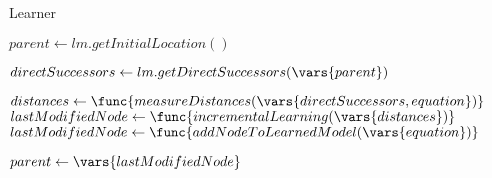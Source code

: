 \usepackage{algorithm}
\usepackage{algpseudocode}  

\begin{algorithm}
	\caption{Learner}
	\label{learner}
	\begin{algorithmic}[1]

			\State $parent \gets lm.getInitialLocation()$
			
			
				\State $directSuccessors \gets lm.getDirectSuccessors(\vars{parent})$
				
					\State $distances \gets \func{measureDistances(\vars{directSuccessors,equation})}$
					\State $lastModifiedNode \gets \func{incrementalLearning(\vars{distances})}$
				\Else
					\State $lastModifiedNode \gets \func{addNodeToLearnedModel(\vars{equation})}$
				\EndIf
				
				\State $parent \gets \vars{lastModifiedNode}$
				
			\EndFor
			
		\EndProcedure
	\end{algorithmic}
\end{algorithm}

